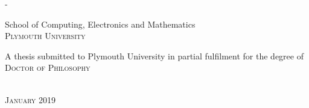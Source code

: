 \begin{titlingpage}
\begin{SingleSpace}
\begin{adjustwidth*}{\unitlength}{-\unitlength}
\begin{center}
\vspace{6mm}
{\large School of Computing, Electronics and Mathematics\\
\textsc{Plymouth University}}\\
\vspace{11mm}
\begin{minipage}{10cm}
A thesis submitted to Plymouth University in partial fulfilment for the degree of \textsc{Doctor of Philosophy}
\end{minipage}\\
\vspace{9mm}
{\large\textsc{January 2019}}
\vspace{12mm}
\end{center}
\begin{flushright}
\end{flushright}
\end{adjustwidth*}
\end{SingleSpace}
\end{titlingpage}